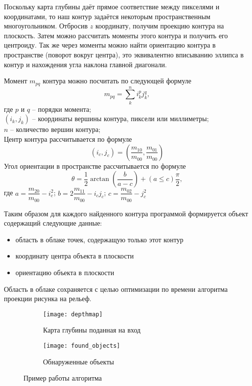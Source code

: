         Поскольку карта глубины даёт прямое соответствие между пикселями и координатами, то наш контур задаётся некоторым пространственным многоугольником. Отбросив $ z $ координату, получим проекцию контура на плоскость. Затем можно рассчитать моменты этого контура и получить его центроиду. Так же через моменты можно найти ориентацию контура в пространстве (поворот вокруг центра), это эквивалентно вписыванию эллипса в контур и нахождения угла наклона главной диагонали.
        
        Момент $ m_{pq} $ контура можно посчитать по следующей формуле
        \begin{equation}
            m_{pq} = \sum\limits_{k}^{n}i_k^p j_k^q,
        \end{equation}
        где $ p $ и $ q $ -- порядки момента;\\
        $ \left(i_k, j_k\right) $ -- координаты вершины контура, пиксели или миллиметры;\\
        $ n $ -- количество вершин контура;\\
        Центр контура рассчитывается по формуле
        \begin{equation}
            (i_c,j_c) = \left(\dfrac{m_{10}}{m_{00}}, \dfrac{m_{01}}{m_{00}}\right)
        \end{equation}
        Угол ориентации в пространстве рассчитывается по формуле
        \begin{equation}
            \theta = \dfrac{1}{2}\arctan\left(\dfrac{b}{a-c}\right) + \left(a\le c\right)\dfrac{\pi}{2},
        \end{equation}
        где $ a = \dfrac{m_{20}}{m_{00}} - i_c^2 $; 
        $ b = 2\dfrac{m_{11}}{m_{00}} - i_cj_c $; 
        $ c = \dfrac{m_{02}}{m_{00}} - j_c^2 $
        
        Таким образом для каждого найденного контура программой формируется объект содержащий следующие данные:
        \begin{itemize}
            \item область в облаке точек, содержащую только этот контур
            \item координату центра объекта в плоскости
            \item ориентацию объекта в плоскости
        \end{itemize}
        Область в облаке сохраняется с целью оптимизации по времени алгоритма проекции рисунка на рельеф.
        
        \begin{figure}[H]
            \begin{subfigure}{0.5\linewidth}
                \texttt{[image: depthmap]}
                \caption{Карта глубины поданная на вход}
            \end{subfigure}
            \begin{subfigure}{0.5\linewidth}
                \texttt{[image: found\_objects]}
                \caption{Обнаруженные объекты}
            \end{subfigure}
            \caption{Пример работы алгоритма}
        \end{figure}
        
